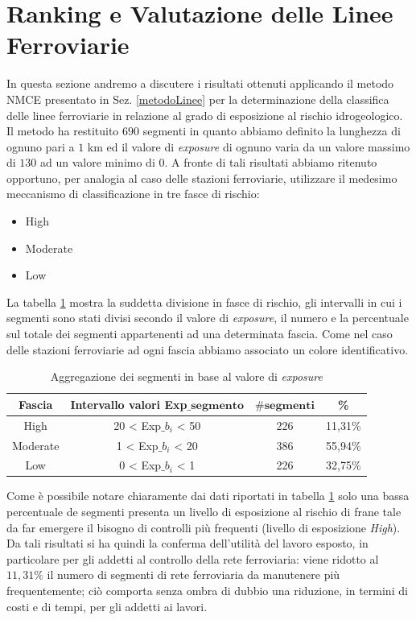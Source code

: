 \section{Ranking e Valutazione delle Linee Ferroviarie}
In questa sezione andremo a discutere i risultati ottenuti applicando il metodo NMCE presentato in Sez. \ref{metodoLinee} per la determinazione della classifica delle linee ferroviarie in relazione al grado di esposizione al rischio idrogeologico.\newline \newline
Il metodo ha restituito $690$ segmenti in quanto abbiamo definito la lunghezza di ognuno pari a $1$ km ed il valore di \textit{exposure} di ognuno varia da un valore massimo di $130$ ad un valore minimo di $0$. A fronte di tali risultati abbiamo ritenuto opportuno, per analogia al caso delle stazioni ferroviarie, utilizzare il medesimo meccanismo di classificazione in tre fasce di rischio:
\begin{itemize}
	\item High
	\item Moderate
	\item Low
\end{itemize}
La tabella \ref{rangeLinee} mostra la suddetta divisione in fasce di rischio, gli intervalli in cui i segmenti sono stati divisi secondo il valore di \textit{exposure}, il numero e la percentuale sul totale dei segmenti appartenenti ad una determinata fascia. Come nel caso delle stazioni ferroviarie ad ogni fascia abbiamo associato un colore identificativo.
\begin{table}[h]
\centering
\begin{tabular}{|c|c|c|c|}
\hline
\rowcolor{lightgray}
\textbf{Fascia} & \textbf{Intervallo valori Exp$\mathbf{\_}$$\mathbf{segmento}$} & $\mathbf{\#segmenti}$ & \textbf{\%} \\
\hline
\rowcolor{flamingopink}
High & 20 < Exp$\_$$b_i$ < 50 & 226 & 11,31\%\\
\hline
\rowcolor{icterine}
Moderate & 1 < Exp$\_$$b_i$ < 20 & 386 & 55,94\%\\
\hline
\rowcolor{inchworm}
Low & $0$ < Exp$\_$$b_i$ < 1 & 226 & 32,75\%\\
\hline
\end{tabular}
\caption{Aggregazione dei segmenti in base al valore di \textit{exposure} }
\label{rangeLinee}
\end{table}
\newline
Come è possibile notare chiaramente dai dati riportati in tabella \ref{rangeLinee} solo una bassa percentuale de segmenti presenta un livello di esposizione al rischio di frane tale da far emergere il bisogno di controlli più frequenti (livello di esposizione \textit{High}). Da tali risultati si ha quindi la conferma dell'utilità del lavoro esposto, in particolare per gli addetti al controllo della rete ferroviaria: viene ridotto al $11,31\%$ il numero di segmenti di rete ferroviaria da manutenere più frequentemente; ciò comporta senza ombra di dubbio una riduzione, in termini di costi e di tempi, per gli addetti ai lavori.\newline
